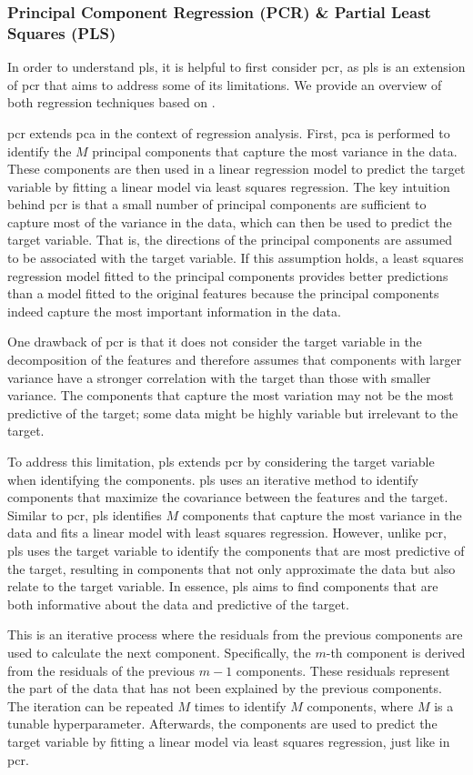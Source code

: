 \subsubsection{Principal Component Regression (PCR) \& Partial Least Squares (PLS)}\label{subsec:pls}
In order to understand \gls{pls}, it is helpful to first consider \gls{pcr}, as \gls{pls} is an extension of \gls{pcr} that aims to address some of its limitations.
We provide an overview of both regression techniques based on \citet{James2023AnIS}.

\gls{pcr} extends \gls{pca} in the context of regression analysis.
First, \gls{pca} is performed to identify the $M$ principal components that capture the most variance in the data.
These components are then used in a linear regression model to predict the target variable by fitting a linear model via least squares regression.
The key intuition behind \gls{pcr} is that a small number of principal components are sufficient to capture most of the variance in the data, which can then be used to predict the target variable.
That is, the directions of the principal components are assumed to be associated with the target variable.
If this assumption holds, a least squares regression model fitted to the principal components provides better predictions than a model fitted to the original features because the principal components indeed capture the most important information in the data.

One drawback of \gls{pcr} is that it does not consider the target variable in the decomposition of the features and therefore assumes that components with larger variance have a stronger correlation with the target than those with smaller variance.
The components that capture the most variation may not be the most predictive of the target; some data might be highly variable but irrelevant to the target.

To address this limitation, \gls{pls} extends \gls{pcr} by considering the target variable when identifying the components.
\gls{pls} uses an iterative method to identify components that maximize the covariance between the features and the target.
Similar to \gls{pcr}, \gls{pls} identifies $M$ components that capture the most variance in the data and fits a linear model with least squares regression.
However, unlike \gls{pcr}, \gls{pls} uses the target variable to identify the components that are most predictive of the target, resulting in components that not only approximate the data but also relate to the target variable.
In essence, \gls{pls} aims to find components that are both informative about the data and predictive of the target.

This is an iterative process where the residuals from the previous components are used to calculate the next component.
Specifically, the $m$-th component is derived from the residuals of the previous $m-1$ components.
These residuals represent the part of the data that has not been explained by the previous components.
The iteration can be repeated $M$ times to identify $M$ components, where $M$ is a tunable hyperparameter.
Afterwards, the components are used to predict the target variable by fitting a linear model via least squares regression, just like in \gls{pcr}.